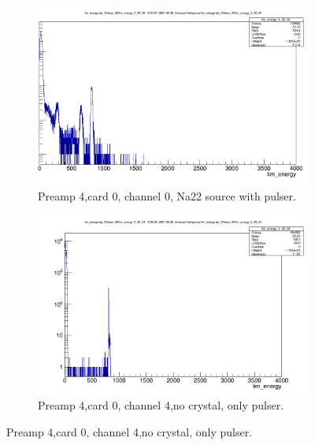 \documentclass{report}
\begin{document}
\begin{figure}[!htb]
  \centering
  \begin{subfigure}[b]{0.45\textwidth}
    \includegraphics[width=\linewidth]{preamp4_lim_energy_card0_ch0.png}
    \caption{Preamp 4,card 0, channel 0, Na22 source with pulser.}
  \end{subfigure}
  \begin{subfigure}[b]{0.45\textwidth}
    \includegraphics[width=\linewidth]{preamp4_lim_energy_card0_ch4_no_crystal.png}
    \caption{Preamp 4,card 0, channel 4,no crystal, only pulser.}
  \end{subfigure}
\end{figure}
\end{document}
